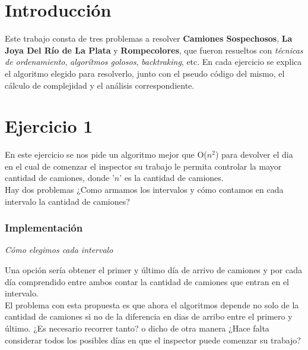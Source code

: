 \documentclass[11pt,a4paper]{article}
\begin{document}
\thispagestyle{empty}
\maketitle
\tableofcontents

\newpage

\section*{Introducción}
Este trabajo consta de tres problemas a resolver \textbf{Camiones Sospechosos},  \textbf{La Joya Del Río de La Plata} y \textbf{Rompecolores}, que fueron resueltos con \textit{técnicas de ordenamiento}, \textit{algorítmos golosos}, \textit{backtraking}, etc. En cada ejercicio se explica el algoritmo elegido para resolverlo, junto con el pseudo código del mismo, el cálculo de complejidad y el análisis correspondiente.

\section*{Ejercicio 1}

En este ejercicio se nos pide un algoritmo mejor que O($n^2$) para devolver el dia en el cual de comenzar el inspector su trabajo le permita controlar la mayor cantidad de camiones, donde '$n$' es la cantidad de camiones.\\
Hay dos problemas ¿Como armamos los intervalos y cómo contamos en cada intervalo la cantidad de camiones?

\subsubsection*{Implementación}

\emph{Cómo elegimos cada intervalo}

Una opción sería obtener el primer y último día de arrivo de camiones y por cada día comprendido entre ambos contar la cantidad de camiones que entran en el intervalo.\\
El problema con esta propuesta es que ahora el algoritmos depende no solo de la cantidad de camiones si no de la diferencia en dias de arribo entre el primero y último.
¿Es necesario recorrer tanto? o dicho de otra manera ¿Hace falta considerar todos los posibles días en que el inspector puede comenzar su trabajo?\\
\end{document}
